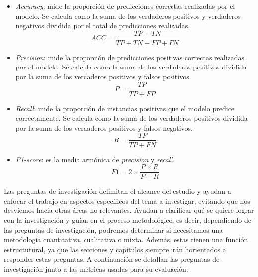 \begin{itemize}
    \item \textit{Accuracy}: mide la proporción de predicciones correctas realizadas por el
          modelo. Se calcula como la suma de los verdaderos positivos y verdaderos negativos
          dividida por el total de predicciones realizadas.
            \begin{equation}
                  ACC = \frac{TP + TN}{TP + TN + FP + FN}
            \end{equation}
    \item \textit{Precision}: mide la proporción de predicciones positivas correctas realizadas
          por el modelo. Se calcula como la suma de los verdaderos positivos dividida por la
          suma de los verdaderos positivos y falsos positivos.
            \begin{equation}
                  P = \frac{TP}{TP + FP}
            \end{equation}
    \item \textit{Recall}: mide la proporción de instancias positivas que el modelo predice
          correctamente. Se calcula como la suma de los verdaderos positivos dividida por la
          suma de los verdaderos positivos y falsos negativos.
            \begin{equation}
                  R = \frac{TP}{TP + FN}
            \end{equation}
    \item \textit{F1-score}: es la media armónica de \textit{precision} y \textit{recall}.
            \begin{equation}
                  F1 = 2 \times \frac{P \times R}{P + R}
            \end{equation}
\end{itemize}

Las preguntas de investigación delimitan el alcance del estudio y ayudan a enfocar el trabajo en
aspectos específicos del tema a investigar, evitando que nos desviemos hacia otras áreas no
relevantes. Ayudan a clarificar qué se quiere lograr con la investigación y guían en el proceso
metodológico, es decir, dependiendo de las preguntas de investigación, podremos determinar
si necesitamos una metodología cuantitativa, cualitativa o mixta. Además, estas tienen una
función estructutural, ya que las secciones y capítulos siempre irán horientados a responder
estas preguntas. A continuación se detallan las preguntas de investigación junto a las
métricas usadas para su evaluación:



